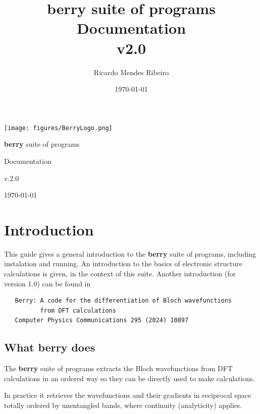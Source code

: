 \documentclass[a4paper,12pt]{report}
\title{{\bf berry} suite of programs\\
\large Documentation \\
v2.0}
\author{Ricardo Mendes Ribeiro}
\date{\today}
\begin{document}
\begin{titlepage}
 \begin{center}
 \texttt{[image: figures/BerryLogo.png]}
 \end{center}
\vspace*{2cm}

 \begin{center}
  \begin{Huge}{\bf berry} suite of programs\end{Huge}
  \vspace*{1cm}

 \begin{LARGE}Documentation\end{LARGE}
  \vspace*{1cm}

\begin{Huge}v.2.0\end{Huge}
  \vspace*{12cm}

\today
 \end{center}
\end{titlepage}

\tableofcontents

\chapter{Introduction}\label{ch:introduction}

 This guide gives a general introduction to the \textbf{berry} suite of programs, including instalation and running.
 An introduction to the basics of electronic structure calculations is given, in the context of this suite.
 Another introduction (for version 1.0) can be found in
  \medskip

 \begin{verbatim}
   Berry: A code for the differentiation of Bloch wavefunctions
          from DFT calculations
   Computer Physics Communications 295 (2024) 10897
 \end{verbatim}



\section{What \textbf{berry} does}

The \textbf{berry} suite of programs extracts the Bloch wavefunctions from DFT calculations in an ordered way
so they can be directly used to make calculations.

In practice it retrieves the wavefunctions and their gradients in reciprocal space totally ordered
by unentangled bands, where continuity (analyticity) applies.
\end{document}
